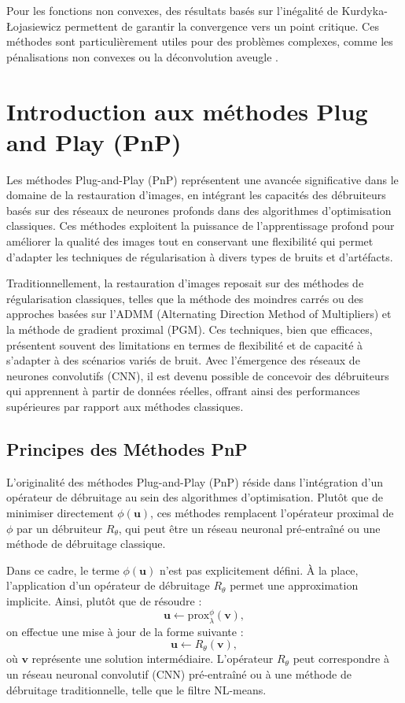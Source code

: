 \documentclass[a4paper, 12pt]{report} %
\begin{document}
Pour les fonctions non convexes, des résultats basés sur l’inégalité de Kurdyka-Łojasiewicz permettent de garantir la convergence vers un point critique. Ces méthodes sont particulièrement utiles pour des problèmes complexes, comme les pénalisations non convexes ou la déconvolution aveugle \cite{chouzenoux2014variable}.

\section{Introduction aux méthodes Plug and Play (PnP)}
Les méthodes Plug-and-Play (PnP) représentent une avancée significative dans le domaine de la restauration d'images, en intégrant les capacités des débruiteurs basés sur des réseaux de neurones profonds dans des algorithmes d'optimisation classiques. Ces méthodes exploitent la puissance de l'apprentissage profond pour améliorer la qualité des images tout en conservant une flexibilité qui permet d'adapter les techniques de régularisation à divers types de bruits et d'artéfacts.


Traditionnellement, la restauration d'images reposait sur des méthodes de régularisation classiques, telles que la méthode des moindres carrés ou des approches basées sur l'ADMM (Alternating Direction Method of Multipliers) et la méthode de gradient proximal (PGM). Ces techniques, bien que efficaces, présentent souvent des limitations en termes de flexibilité et de capacité à s'adapter à des scénarios variés de bruit. Avec l'émergence des réseaux de neurones convolutifs (CNN), il est devenu possible de concevoir des débruiteurs qui apprennent à partir de données réelles, offrant ainsi des performances supérieures par rapport aux méthodes classiques.

\subsection{Principes des Méthodes PnP}

L’originalité des méthodes Plug-and-Play (PnP) réside dans l’intégration d’un opérateur de débruitage au sein des algorithmes d’optimisation. Plutôt que de minimiser directement \( \phi(\mathbf{u}) \), ces méthodes remplacent l’opérateur proximal de \( \phi \) par un débruiteur \( R_\theta \), qui peut être un réseau neuronal pré-entraîné ou une méthode de débruitage classique.

Dans ce cadre, le terme \( \phi(\mathbf{u}) \) n'est pas explicitement défini. À la place, l'application d'un opérateur de débruitage \( R_\theta \) permet une approximation implicite. Ainsi, plutôt que de résoudre :
\[
\mathbf{u} \leftarrow \text{prox}_{\lambda}^{\phi}(\mathbf{v}),
\]
on effectue une mise à jour de la forme suivante :
\[
\mathbf{u} \leftarrow R_\theta(\mathbf{v}), 
\]
où \( \mathbf{v} \) représente une solution intermédiaire. L’opérateur \( R_\theta \) peut correspondre à un réseau neuronal convolutif (CNN) pré-entraîné ou à une méthode de débruitage traditionnelle, telle que le filtre NL-means.
\end{document}
